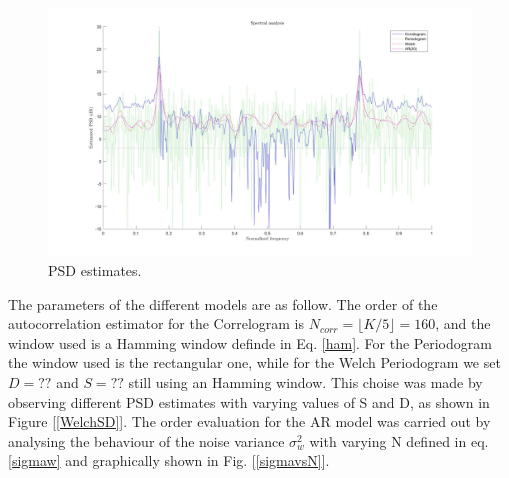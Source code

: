 \documentclass[a4paper,11pt,openright,twoside]{report}
\begin{document}
\begin{figure}
	\centering
	\includegraphics[width=14cm]{images/PSD.jpg}
	\caption{PSD estimates.}\label{PSD} 
\end{figure}

The parameters of the different models are as follow. The order of the autocorrelation estimator for the Correlogram is $ N_{corr} = \lfloor K/5 \rfloor = 160 $, and the window used is a Hamming window definde in Eq. \ref{ham}. For the Periodogram the window used is the rectangular one, while for the Welch Periodogram we set $D=??$ and $S=??$ still using an Hamming window. This choise was made by observing different PSD estimates with varying values of S and D, as shown in Figure [\ref{WelchSD}]. The order evaluation for the AR model was carried out by analysing the behaviour of the noise variance $\sigma_w^2$ with varying N defined in eq. \ref{sigmaw} and graphically shown in Fig. [\ref{sigmavsN}].
\end{document}
